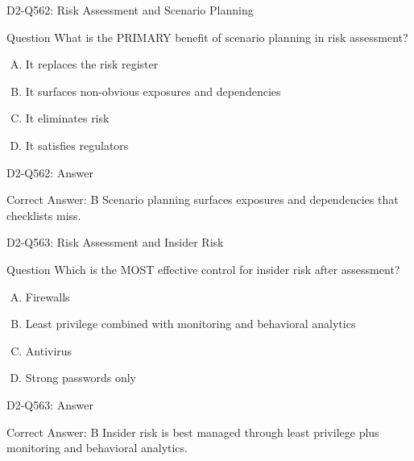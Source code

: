 \documentclass{beamer}
\begin{document}
	\begin{frame}{D2-Q562: Risk Assessment and Scenario Planning}
		\begin{block}{Question}
			What is the PRIMARY benefit of scenario planning in risk assessment?
		\end{block}
		\begin{enumerate}[(A)]
			\item It replaces the risk register
			\item It surfaces non-obvious exposures and dependencies
			\item It eliminates risk
			\item It satisfies regulators
		\end{enumerate}
	\end{frame}
	\begin{frame}{D2-Q562: Answer}
		\begin{block}{Correct Answer: B}
			Scenario planning surfaces exposures and dependencies that checklists miss.
		\end{block}
	\end{frame}
	
	\begin{frame}{D2-Q563: Risk Assessment and Insider Risk}
		\begin{block}{Question}
			Which is the MOST effective control for insider risk after assessment?
		\end{block}
		\begin{enumerate}[(A)]
			\item Firewalls
			\item Least privilege combined with monitoring and behavioral analytics
			\item Antivirus
			\item Strong passwords only
		\end{enumerate}
	\end{frame}
	\begin{frame}{D2-Q563: Answer}
		\begin{block}{Correct Answer: B}
			Insider risk is best managed through least privilege plus monitoring and behavioral analytics.
		\end{block}
	\end{frame}
	
\end{document}
